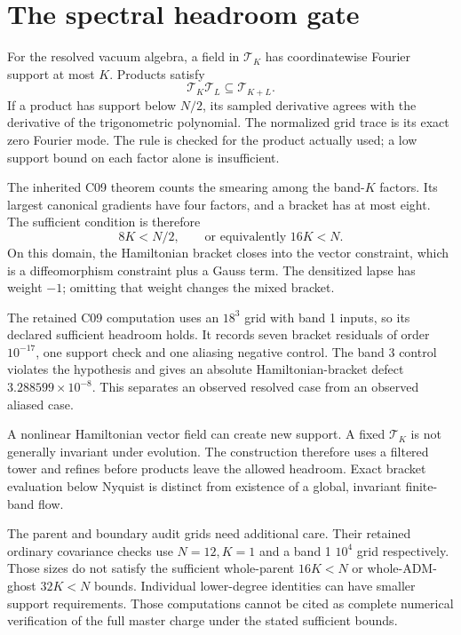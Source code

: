 \clearpage
\section{The spectral headroom gate}\label{c:verify:headroom}

For the resolved vacuum algebra, a field in \(\mathcal T_K\) has coordinatewise Fourier support at most \(K\). Products satisfy
\[
 \mathcal T_K\mathcal T_L\subseteq\mathcal T_{K+L}.
\]
If a product has support below \(N/2\), its sampled derivative agrees with the derivative of the trigonometric polynomial. The normalized grid trace is its exact zero Fourier mode. The rule is checked for the product actually used; a low support bound on each factor alone is insufficient.

The inherited C09 theorem counts the smearing among the band-\(K\) factors. Its largest canonical gradients have four factors, and a bracket has at most eight. The sufficient condition is therefore
\[
 8K<N/2,\qquad\text{or equivalently }16K<N.
\]
On this domain, the Hamiltonian bracket closes into the vector constraint, which is a diffeomorphism constraint plus a Gauss term. The densitized lapse has weight \(-1\); omitting that weight changes the mixed bracket.

The retained C09 computation uses an \(18^3\) grid with band 1 inputs, so its declared sufficient headroom holds. It records seven bracket residuals of order \(10^{-17}\), one support check and one aliasing negative control. The band 3 control violates the hypothesis and gives an absolute Hamiltonian-bracket defect \(3.288599\times10^{-8}\). This separates an observed resolved case from an observed aliased case.

A nonlinear Hamiltonian vector field can create new support. A fixed \(\mathcal T_K\) is not generally invariant under evolution. The construction therefore uses a filtered tower and refines before products leave the allowed headroom. Exact bracket evaluation below Nyquist is distinct from existence of a global, invariant finite-band flow.

The parent and boundary audit grids need additional care. Their retained ordinary covariance checks use \(N=12,K=1\) and a band 1 \(10^4\) grid respectively. Those sizes do not satisfy the sufficient whole-parent \(16K<N\) or whole-ADM-ghost \(32K<N\) bounds. Individual lower-degree identities can have smaller support requirements. Those computations cannot be cited as complete numerical verification of the full master charge under the stated sufficient bounds.



